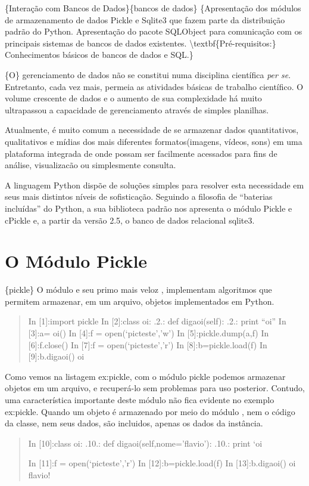 \documentclass[a4paper,10pt,portuguese]{sphinxmanual}
\begin{document}
\{Interação com Bancos de Dados\}\{bancos de dados\}
\{Apresentação dos módulos de armazenamento de dados Pickle e Sqlite3 que fazem parte da distribuição padrão do Python. Apresentação do pacote SQLObject para comunicação com os principais sistemas de bancos de dados existentes. \textbackslash{}textbf\{Pré-requisitos:\} Conhecimentos básicos de bancos de dados e SQL.\}

\{O\} gerenciamento de dados não se constitui numa disciplina
científica \emph{per se}. Entretanto, cada vez mais, permeia as
atividades básicas de trabalho científico. O volume crescente de
dados e o aumento de sua complexidade há muito ultrapassou a
capacidade de gerenciamento através de simples planilhas.

Atualmente, é muito comum a necessidade de se armazenar dados
quantitativos, qualitativos e mídias dos mais diferentes
formatos(imagens, vídeos, sons) em uma plataforma integrada de onde
possam ser facilmente acessados para fins de análise, visualizacão
ou simplesmente consulta.

A linguagem Python dispõe de soluções simples para resolver esta
necessidade em seus mais distintos níveis de sofisticação. Seguindo
a filosofia de ``baterias incluídas'' do Python, a sua biblioteca
padrão nos apresenta o módulo Pickle e cPickle e, a partir da
versão 2.5, o banco de dados relacional sqlite3.


\chapter{O Módulo Pickle}
\label{capbd:o-modulo-pickle}\label{capbd::doc}
\{pickle\} O módulo  e seu primo mais veloz ,
implementam algoritmos que permitem armazenar, em um arquivo,
objetos implementados em Python.
\begin{quote}

In {[}1{]}:import pickle In {[}2{]}:class oi: .2.: def digaoi(self): .2.:
print ``oi'' In {[}3{]}:a= oi() In {[}4{]}:f = open(`picteste','w') In
{[}5{]}:pickle.dump(a,f) In {[}6{]}:f.close() In {[}7{]}:f =
open(`picteste','r') In {[}8{]}:b=pickle.load(f) In {[}9{]}:b.digaoi() oi
\end{quote}

Como vemos na listagem ex:pickle, com o módulo pickle podemos
armazenar objetos em um arquivo, e recuperá-lo sem problemas para
uso posterior. Contudo, uma característica importante deste módulo
não fica evidente no exemplo ex:pickle. Quando um objeto é
armazenado por meio do módulo , nem o código da classe,
nem seus dados, são incluidos, apenas os dados da instância.
\begin{quote}

In {[}10{]}:class oi: .10.: def digaoi(self,nome='flavio'): .10.: print
`oi

In {[}11{]}:f = open(`picteste','r') In {[}12{]}:b=pickle.load(f) In
{[}13{]}:b.digaoi() oi flavio!
\end{quote}
\end{document}
